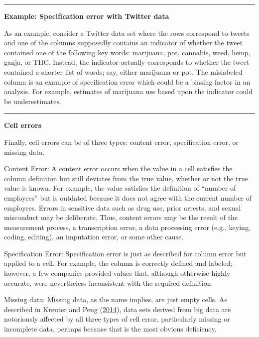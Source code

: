 \documentclass[]{krantz}
\begin{document}
\begin{center}\rule{0.5\linewidth}{\linethickness}\end{center}

\textbf{Example: Specification error with Twitter data}

As an example, consider a Twitter data set where the rows correspond to
tweets and one of the columns supposedly contains an indicator of
whether the tweet contained one of the following key words: marijuana,
pot, cannabis, weed, hemp, ganja, or THC. Instead, the indicator
actually corresponds to whether the tweet contained a shorter list of
words; say, either marijuana or pot. The mislabeled column is an example
of specification error which could be a biasing factor in an analysis.
For example, estimates of marijuana use based upon the indicator could
be underestimates.

\begin{center}\rule{0.5\linewidth}{\linethickness}\end{center}

\textbf{Cell errors}

Finally, cell errors can be of three types: content error, specification
error, or missing data.

Content Error: A content error occurs when the value in a cell satisfies
the column definition but still deviates from the true value, whether or
not the true value is known. For example, the value satisfies the
definition of ``number of employees'' but is outdated because it does
not agree with the current number of employees. Errors in sensitive data
such as drug use, prior arrests, and sexual misconduct may be
deliberate. Thus, content errors may be the result of the measurement
process, a transcription error, a data processing error (e.g., keying,
coding, editing), an imputation error, or some other cause.

Specification Error: Specification error is just as described for column
error but applied to a cell. For example, the column is correctly
defined and labeled; however, a few companies provided values that,
although otherwise highly accurate, were nevertheless inconsistent with
the required definition.

Missing data: Missing data, as the name implies, are just empty cells.
As described in Kreuter and Peng
(\protect\hyperlink{ref-kreuter201412}{2014}), data sets derived from
big data are notoriously affected by all three types of cell error,
particularly missing or incomplete data, perhaps because that is the
most obvious deficiency.
\end{document}
